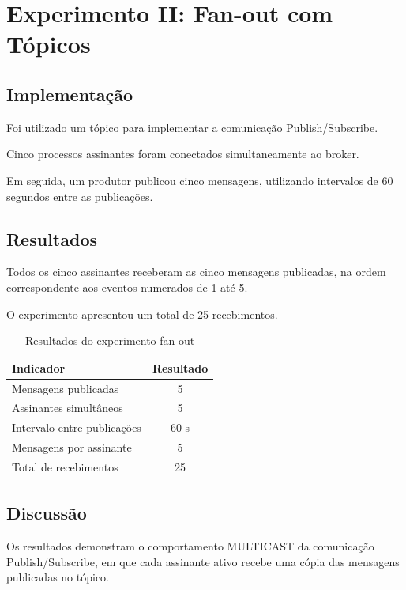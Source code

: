 \documentclass[12pt,a4paper]{article}
\begin{document}
\section{Experimento II: Fan-out com Tópicos}

\subsection{Implementação}

Foi utilizado um tópico para implementar
a comunicação Publish/Subscribe.

Cinco processos assinantes foram conectados
simultaneamente ao broker.

Em seguida, um produtor publicou cinco
mensagens, utilizando intervalos de
60 segundos entre as publicações.

\subsection{Resultados}

Todos os cinco assinantes receberam as
cinco mensagens publicadas, na ordem
correspondente aos eventos numerados
de 1 até 5.

O experimento apresentou um total de
25 recebimentos.

\begin{table}[H]
\centering
\caption{Resultados do experimento fan-out}
\begin{tabular}{lc}
\toprule
\textbf{Indicador} & \textbf{Resultado} \\
\midrule
Mensagens publicadas & 5 \\
Assinantes simultâneos & 5 \\
Intervalo entre publicações & 60 s \\
Mensagens por assinante & 5 \\
Total de recebimentos & 25 \\
\bottomrule
\end{tabular}
\label{tab:fanout}
\end{table}

\subsection{Discussão}

Os resultados demonstram o comportamento
MULTICAST da comunicação Publish/Subscribe,
em que cada assinante ativo recebe uma
cópia das mensagens publicadas no tópico.
\end{document}
